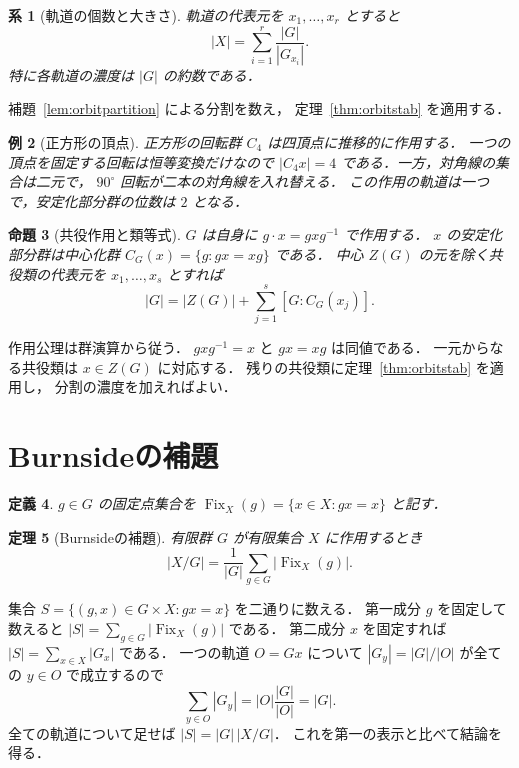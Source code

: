 \documentclass[a5paper,10pt,onecolumn]{jsarticle}
\makeatletter
\theoremstyle{mathnotetheorem}
\newtheorem{theorem}{定理}[section]
\newtheorem{definition}[theorem]{定義}
\newtheorem{proposition}[theorem]{命題}
\newtheorem{corollary}[theorem]{系}
\newtheorem{example}[theorem]{例}
\renewcommand{\proofname}{証明}
\renewenvironment{proof}[1][\proofname]{%
  \par\pushQED{\qed}\normalfont\topsep4\p@\@plus2\p@\relax
  \trivlist\item[\hskip\labelsep\bfseries #1]\ignorespaces
}{\popQED\endtrivlist\@endpefalse}
\makeatother
\begin{document}
\begin{corollary}[軌道の個数と大きさ]\label{cor:orbitsize}
軌道の代表元を $x_1,\ldots,x_r$ とすると
\[
  |X|=\sum_{i=1}^r\frac{|G|}{|G_{x_i}|}.
\]
特に各軌道の濃度は $|G|$ の約数である．
\end{corollary}
\begin{proof}
補題~\ref{lem:orbitpartition} による分割を数え，
定理~\ref{thm:orbitstab} を適用する．
\end{proof}

\begin{example}[正方形の頂点]
正方形の回転群 $C_4$ は四頂点に推移的に作用する．
一つの頂点を固定する回転は恒等変換だけなので
$|C_4x|=4$ である．一方，対角線の集合は二元で，
$90^\circ$ 回転が二本の対角線を入れ替える．
この作用の軌道は一つで，安定化部分群の位数は $2$ となる．
\end{example}

\begin{proposition}[共役作用と類等式]\label{prop:classeq}
$G$ は自身に $g\cdot x=gxg^{-1}$ で作用する．
$x$ の安定化部分群は中心化群
$C_G(x)=\{g:gx=xg\}$ である．
中心 $Z(G)$ の元を除く共役類の代表元を
$x_1,\ldots,x_s$ とすれば
\[
 |G|=|Z(G)|+
 \sum_{j=1}^s[G:C_G(x_j)].
\]
\end{proposition}
\begin{proof}
作用公理は群演算から従う．
$gxg^{-1}=x$ と $gx=xg$ は同値である．
一元からなる共役類は $x\in Z(G)$ に対応する．
残りの共役類に定理~\ref{thm:orbitstab} を適用し，
分割の濃度を加えればよい．
\end{proof}

\section{Burnsideの補題}
\begin{definition}
$g\in G$ の固定点集合を
$\operatorname{Fix}_X(g)=\{x\in X:gx=x\}$ と記す．
\end{definition}

\begin{theorem}[Burnsideの補題]\label{thm:burnside}
有限群 $G$ が有限集合 $X$ に作用するとき
\begin{equation}\label{eq:burnside}
 |X/G|=\frac1{|G|}\sum_{g\in G}|\operatorname{Fix}_X(g)|.
\end{equation}
\end{theorem}
\begin{proof}
集合 $S=\{(g,x)\in G\times X:gx=x\}$ を二通りに数える．
第一成分 $g$ を固定して数えると
$|S|=\sum_{g\in G}|\operatorname{Fix}_X(g)|$ である．
第二成分 $x$ を固定すれば
$|S|=\sum_{x\in X}|G_x|$ である．
一つの軌道 $O=Gx$ について
$|G_y|=|G|/|O|$ が全ての $y\in O$ で成立するので
\[
 \sum_{y\in O}|G_y|
 =|O|\frac{|G|}{|O|}=|G|.
\]
全ての軌道について足せば $|S|=|G|\,|X/G|$．
これを第一の表示と比べて結論を得る．
\end{proof}
\end{document}
